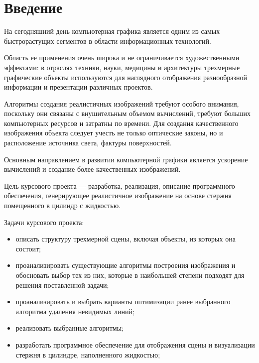 \chapter*{Введение}

На сегодняшний день компьютерная графика является одним из самых быстрорастущих сегментов в области информационных технологий.

Область ее применения очень широка и не ограничивается художественными эффектами: в отраслях техники, науки, медицины и архитектуры трехмерные графические объекты используются для наглядного отображения разнообразной информации и презентации различных проектов.

Алгоритмы создания реалистичных изображений требуют особого внимания, поскольку они связаны с внушительным объемом вычислений, требуют больших компьютерных ресурсов и затратны по времени. Для создания качественного изображения объекта следует учесть не только оптические законы, но и расположение источника света, фактуры поверхностей. 

Основным направлением в развитии компьютерной графики является ускорение вычислений и создание более качественных изображений.

Цель курсового проекта --- разработка, реализация, описание программного обеспечения, генерирующее реалистичное изображение на основе стержня помещенного в цилиндр с жидкостью.   

\newpage

Задачи курсового проекта:

\begin{itemize}
	\item описать структуру трехмерной сцены, включая объекты, из которых она состоит;
	\item проанализировать существующие алгоритмы построения изображения и обосновать выбор тех из них, которые в наибольшей степени подходят для решения поставленной задачи;
	\item проанализировать и выбрать варианты оптимизации ранее выбранного алгоритма удаления невидимых линий;
	\item реализовать выбранные алгоритмы;
	\item разработать программное обеспечение для отображения сцены и визуализации стержня в цилиндре, наполненного жидкостью; 
\end{itemize}
